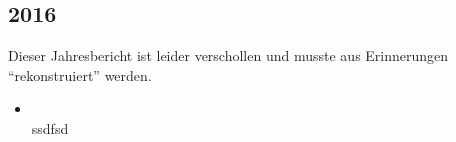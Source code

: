 \subsection*{2016}
\begin{history}

    Dieser Jahresbericht ist leider verschollen und musste aus Erinnerungen \enquote{rekonstruiert} werden.

    \begin{itemize}

        \item \\
              ssdfsd


    \end{itemize}

\end{history}
